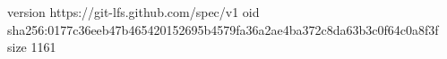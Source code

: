 version https://git-lfs.github.com/spec/v1
oid sha256:0177c36eeb47b465420152695b4579fa36a2ae4ba372c8da63b3c0f64c0a8f3f
size 1161
